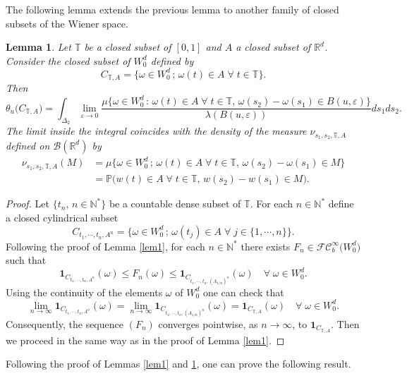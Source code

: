 \documentclass[]{interact}
\newcommand{\R}{{\mathbb{R}}}
\newcommand{\1}{\mathbf{1}}
\newcommand{\N}{{\mathbb N}}
\newcommand{\ve}{\varepsilon}
\newcommand{\PP}{{\mathbb{P}}}
\theoremstyle{plain}%
\newtheorem{lem}[thm]{Lemma}
\theoremstyle{definition}
\theoremstyle{remark}
\begin{document}
\noindent The following lemma extends the previous lemma to another family of closed subsets of the Wiener space.


\begin{lem}\label{lem200}
Let $\mathbb{T}$ be a closed subset of $[0,1]$ and $A$ a closed subset of $\R^{d}$. Consider the closed subset of $W_0^d$ defined by 
$$ C_{\mathbb{T},A}=\{ \omega \in W_0^d\, ;\, \omega (t)\in A \; \forall \; t\in \mathbb{T}\}. $$
Then 
$$\theta_u\big(C_{\mathbb{T},A}\big)=\int_{\Delta_2  } \lim_{\ve \to 0} \dfrac{ \mu \big\{ \omega \in W_0^d\, :\,  \omega (t)\in A \; \forall \; t\in \mathbb{T}, \, \omega(s_2)-\omega(s_1)\in B(u,\ve)\big\} }{ \lambda (B(u,\ve)) } ds_1ds_2. $$
The limit inside the integral coincides with the density of the measure $\nu_{s_1,s_2,\mathbb{T} ,A}$ defined on $\mathcal{B}(\R^d)$ by 
\begin{align*}
\nu_{s_1,s_2,\mathbb{T},A} (M)
&=\mu \big\{ \omega \in W_0^d\, ;\, \omega (t)\in A \; \forall \; t\in \mathbb{T} , \,\omega(s_2)-\omega(s_1)\in M\big\}\\
&=\PP \big( w (t)\in A \; \forall \; t\in \mathbb{T} , \, w(s_2)-w(s_1)\in M\big). 
\end{align*} 
\end{lem}


\begin{proof} Let $\{t_n,\,n\in \N^*\}$ be a countable dense subset of $\mathbb{T}$. For each $n\in \N^*$ define a closed cylindrical subset 
$$  C_{t_1,\cdots,t_n,A^n}=\{ \omega \in W_0^d\, ;\, \omega (t_j)\in A \; \forall \; j\in \{ 1,\cdots,n\} \}. $$
Following the proof of Lemma \ref{lem1}, for each $n\in \N^*$ there exists $F_n\in \mathcal{FC}_b^{\infty}\big( W_0^d\big) $ such that 
$$ \mathbf{1}_{C_{t_1,\cdots,t_n,A^n} } (\omega)\leqslant F_n (\omega)\leqslant \mathbf{1}_{C_{t_1,\cdots,t_n,( A_{1/n } )^n}}(\omega) \quad \forall \; \omega \in W_0^d. $$
Using the continuity of the elements $\omega$ of $W_0^d$ one can check that 
$$ \lim _{n\to\infty} \mathbf{1}_{C_{t_1,\cdots,t_n,A^n} } (\omega)= \lim _{n\to\infty} \mathbf{1}_{C_{t_1,\cdots,t_n,(A_{1/n })^n} } (\omega)=\mathbf{1}_{C_{\mathbb{T},A} } (\omega) \quad \forall \; \omega \in W_0^d. $$
Consequently, the sequence $( F_n)$ converges pointwise, as $n \to \infty$, to $\mathbf{1}_{C_{\mathbb{T},A} }$. Then we proceed in the same way as in the proof of Lemma \ref{lem1}. 
\end{proof}

Following the proof of Lemmas \ref{lem1} and \ref{lem200}, one can prove the following result.
\end{document}
